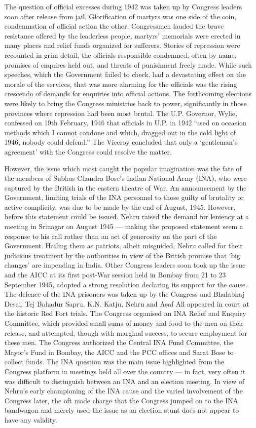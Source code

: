 The question of official excesses during 1942 was taken up by Congress leaders soon after release from jail. Glorification of martyrs was one side of the coin, condemnation of official action the other. Congressmen lauded the brave resistance offered by the leaderless people, martyrs' memorials were erected in many places and relief funds organized for sufferers. Stories of repression were recounted in grim detail, the officials responsible condemned, often by name, promises of enquires held out, and threats of punishment freely made. While such speeches, which the Government failed to check, had a devastating effect on the morale of the services, that was more alarming for the officials was the rising crescendo of demands for enquiries into official actions. The forthcoming elections were likely to bring the Congress ministries back to power, significantly in those provinces where repression had been most brutal. The U.P. Governor, Wylie, confessed on 19th February, 1946 that officials in U.P. in 1942 `used on occasion methods which I cannot condone and which, dragged out in the cold light of 1946, nobody could defend.'' The Viceroy concluded that only a `gentleman's agreement' with the Congress could resolve the matter. 

However, the issue which most caught the popular imagination was the fate of the members of Subhas Chandra Bose's Indian National Army (INA), who were captured by the British in the eastern theatre of War. An announcement by the Government, limiting trials of the INA personnel to those guilty of brutality or active complicity, was due to be made by the end of August, 1945. However, before this statement could be issued. Nehru raised the demand for leniency at a meeting in Srinagar on August 1945 — making the proposed statement seem a response to his call rather than an act of generosity on the part of the Government. Hailing them as patriots, albeit misguided, Nehru called for their judicious treatment by the authorities in view of the British promise that `big changes' are impending in India. Other Congress leaders soon took up the issue and the AICC at its first post-War session held in Bombay from 21 to 23 September 1945, adopted a strong resolution declaring its support for the cause. The defence of the INA prisoners was taken up by the Congress and Bhulabhaj Desai, Tej Bahadur Sapru, K.N. Katju, Nehru and Asaf All appeared in court at the historic Red Fort trials. The Congress organised an INA Relief and Enquiry Committee, which provided small sums of money and food to the men on their release, and attempted, though with marginal success, to secure employment for these men. The Congress authorized the Central INA Fund Committee, the Mayor's Fund in Bombay, the AICC and the PCC offices and Sarat Bose to collect funds. The INA question was the main issue highlighted from the Congress platform in meetings held all over the country — in fact, very often it was difficult to distinguish between an INA and an election meeting. In view of Nehru's early championing of the INA cause and the varied involvement of the Congress later, the oft made charge that the Congress jumped on to the INA bandwagon and merely used the issue as an election stunt does not appear to have any validity. 

